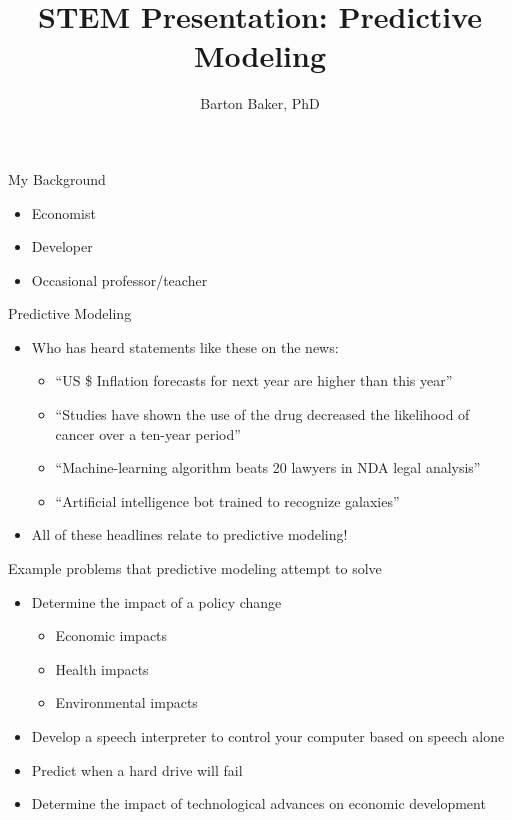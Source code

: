 \documentclass[10pt]{beamer}
\title{STEM Presentation: Predictive Modeling}
\author{Barton Baker, PhD}
\begin{document}
\frame{\titlepage}

\begin{frame}[t]{My Background}
  \begin{itemize}
    \item Economist
    \item Developer
    \item Occasional professor/teacher
  \end{itemize}
\end{frame}

\begin{frame}[t]{Predictive Modeling}
  \begin{itemize}
    \item Who has heard statements like these on the news:
    \begin{itemize}
      \item<2-> ``US \$ Inflation forecasts for next year are higher than this
        year''
      \item<3-> ``Studies have shown the use of the drug decreased the
        likelihood of cancer over a ten-year period''
      \item<4-> ``Machine-learning algorithm beats 20 lawyers in NDA legal
        analysis''
      \item<5-> ``Artificial intelligence bot trained to recognize galaxies''
    \end{itemize}
    \item<6-> All of these headlines relate to predictive modeling!
  \end{itemize}
\end{frame}

\begin{frame}[t]{Example problems that predictive modeling attempt to solve}
  \begin{itemize}
    \item Determine the impact of a policy change
      \begin{itemize}
        \item Economic impacts
        \item Health impacts
        \item Environmental impacts
      \end{itemize}
    \item<2-> Develop a speech interpreter to control your computer based on
      speech alone
    \item<3-> Predict when a hard drive will fail
    \item<4-> Determine the impact of technological advances on economic
      development
  \end{itemize}

\end{frame}
\end{document}
